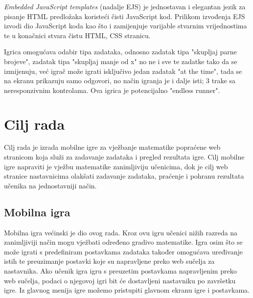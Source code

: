 \documentclass[times, utf8, zavrsni, numeric]{fer}
\begin{document}
	\textit{Embedded JavaScript templates} (nadalje EJS)\cite{ejs} je jednostavan i elegantan jezik za pisanje HTML predložaka koristeći čisti JavaScript kod. Prilikom izvođenja EJS izvodi dio JavaScript koda kao što i zamijenjuje varijable stvarnim vrijednostima te
	u konačnici stvara čistu HTML, CSS stranicu.
	


Igrica omogućava odabir tipa zadataka, odnosno zadatak tipa "skupljaj parne brojeve", zadatak tipa "skupljaj manje od x" no ne i sve te zadatke tako da se izmijenuju, već igrač može igrati isključivo jedan zadatak "at the time", tada se na ekranu 
prikazuju samo odgovori, no način igranja je i dalje isti; 3 trake sa neresponzivnim kontrolama. Ova igrica je potencijalno "endless runner". 


\chapter{Cilj rada}
Cilj rada je izrada mobilne igre za vježbanje matematike popraćene web stranicom koja služi za zadavanje zadataka i pregled rezultata igre. Cilj mobilne igre napraviti je vježbu matematike zanimljiviju učenicima, 
dok je cilj web stranice nastavnicima olakšati zadavanje zadataka, praćenje i pohranu rezultata učenika na jednostavniji način.

	\section{Mobilna igra}
	Mobilna igra većinski je dio ovog rada. Kroz ovu igru učenici nižih razreda na zanimljiviji način mogu vježbati određeno gradivo matematike. Igra osim što se može igrati s predefiniram postavkama zadataka također omogućava uređivanje istih
	te preuzimanje postavki koje su napravljene preko web sučelja za nastavnika. Ako učenik igra igru s preuzetim postavkama napravljenim preko web sučelja, podaci o njegovoj igri bit će dostavljeni nastavniku po završetku igre.
	Iz glavnog menija igre možemo pristupiti glavnom ekranu igre i postavkama.
		
\end{document}
